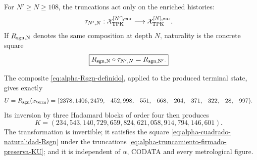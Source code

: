 \begin{definition}
For \(N'\geq N\geq108\), the truncations act only on the enriched
histories:
\begin{equation}\label{eq:alpha-truncamiento-firmado-preserva-KU}
 \tau_{N',N}:
 \mathcal X_{\rm TPK}^{[N'],\rm enr}
 \longrightarrow\mathcal X_{\rm TPK}^{[N],\rm enr}.
\end{equation}
If \(R_{\rm sgn,N}\) denotes the same composition at depth \(N\), naturality
is the concrete square
\begin{equation}\label{eq:alpha-cuadrado-naturalidad-Rsgn}
 \boxed{
 R_{\rm sgn,N}\circ\tau_{N',N}
 =R_{\rm sgn,N'}.}
\end{equation}
\end{definition}

\begin{theorem}
\label{thm:alpha-Rsgn-construido}
The composite \eqref{eq:alpha-Rsgn-definido}, applied to the produced terminal
state, gives exactly
\begin{equation}\label{eq:alpha-Rsgn-evaluacion}
 U=R_{\rm sgn}(x_{\rm term})
 =(2378,1406,2479,-452,998,-551,-668,-204,-371,-322,-28,-997).
\end{equation}
Its inversion by three Hadamard blocks of order four then produces
\[
 \boxed{
 K=(234,543,140,729,659,824,621,058,914,794,146,601).}
\]
The transformation is invertible; it satisfies the square
\eqref{eq:alpha-cuadrado-naturalidad-Rsgn} under the truncations
\eqref{eq:alpha-truncamiento-firmado-preserva-KU}; and it is independent of
\(\alpha\), CODATA and every metrological figure.
\end{theorem}

